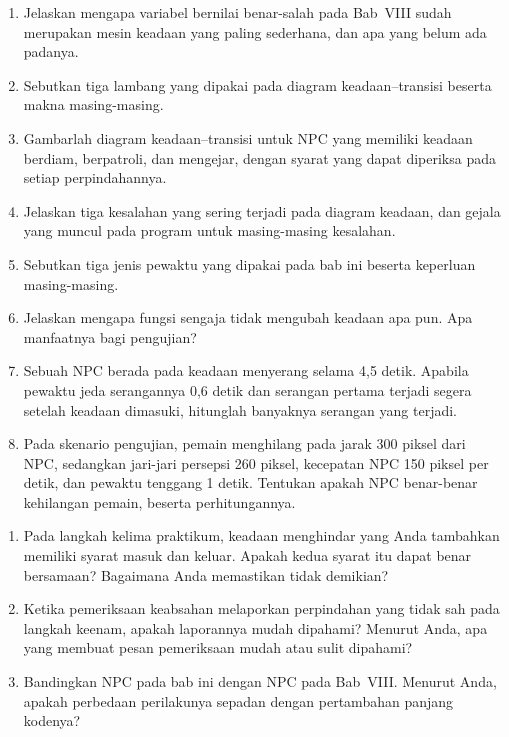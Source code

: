 
\begin{enumerate}
  \item Jelaskan mengapa variabel bernilai benar-salah pada Bab~VIII sudah
        merupakan mesin keadaan yang paling sederhana, dan apa yang belum ada
        padanya.

  \item Sebutkan tiga lambang yang dipakai pada diagram keadaan--transisi
        beserta makna masing-masing.

  \item Gambarlah diagram keadaan--transisi untuk NPC yang memiliki keadaan
        berdiam, berpatroli, dan mengejar, dengan syarat yang dapat diperiksa
        pada setiap perpindahannya.

  \item Jelaskan tiga kesalahan yang sering terjadi pada diagram keadaan, dan
        gejala yang muncul pada program untuk masing-masing kesalahan.

  \item Sebutkan tiga jenis pewaktu yang dipakai pada bab ini beserta keperluan
        masing-masing.

  \item Jelaskan mengapa fungsi  sengaja tidak mengubah keadaan
        apa pun. Apa manfaatnya bagi pengujian?

  \item Sebuah NPC berada pada keadaan menyerang selama 4,5 detik. Apabila
        pewaktu jeda serangannya 0,6 detik dan serangan pertama terjadi segera
        setelah keadaan dimasuki, hitunglah banyaknya serangan yang terjadi.

  \item Pada skenario pengujian, pemain menghilang pada jarak 300 piksel dari
        NPC, sedangkan jari-jari persepsi 260 piksel, kecepatan NPC 150 piksel
        per detik, dan pewaktu tenggang 1 detik. Tentukan apakah NPC benar-benar
        kehilangan pemain, beserta perhitungannya.
\end{enumerate}

\begin{refleksibox}
\begin{enumerate}
  \item Pada langkah kelima praktikum, keadaan menghindar yang Anda tambahkan
        memiliki syarat masuk dan keluar. Apakah kedua syarat itu dapat benar
        bersamaan? Bagaimana Anda memastikan tidak demikian?
  \item Ketika pemeriksaan keabsahan melaporkan perpindahan yang tidak sah pada
        langkah keenam, apakah laporannya mudah dipahami? Menurut Anda, apa
        yang membuat pesan pemeriksaan mudah atau sulit dipahami?
  \item Bandingkan NPC pada bab ini dengan NPC pada Bab~VIII. Menurut Anda,
        apakah perbedaan perilakunya sepadan dengan pertambahan panjang kodenya?
\end{enumerate}
\end{refleksibox}
